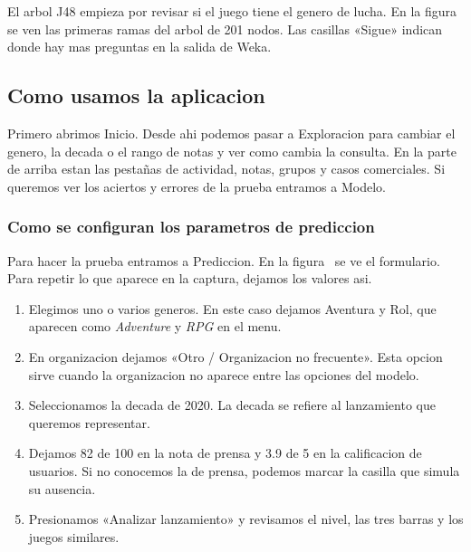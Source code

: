 
El arbol J48 empieza por revisar si el juego tiene el genero de lucha. En la figura~ se ven las primeras ramas del arbol de 201 nodos. Las casillas «Sigue» indican donde hay mas preguntas en la salida de Weka.


\subsection{Como usamos la aplicacion}
Primero abrimos Inicio. Desde ahi podemos pasar a Exploracion para cambiar el genero, la decada o el rango de notas y ver como cambia la consulta. En la parte de arriba estan las pestañas de actividad, notas, grupos y casos comerciales. Si queremos ver los aciertos y errores de la prueba entramos a Modelo.


\subsubsection{Como se configuran los parametros de prediccion}
Para hacer la prueba entramos a Prediccion. En la figura~ se ve el formulario. Para repetir lo que aparece en la captura, dejamos los valores asi.

\begin{enumerate}
\item Elegimos uno o varios generos. En este caso dejamos Aventura y Rol, que aparecen como \emph{Adventure} y \emph{RPG} en el menu.
\item En organizacion dejamos «Otro / Organizacion no frecuente». Esta opcion sirve cuando la organizacion no aparece entre las opciones del modelo.
\item Seleccionamos la decada de 2020. La decada se refiere al lanzamiento que queremos representar.
\item Dejamos 82 de 100 en la nota de prensa y 3.9 de 5 en la calificacion de usuarios. Si no conocemos la de prensa, podemos marcar la casilla que simula su ausencia.
\item Presionamos «Analizar lanzamiento» y revisamos el nivel, las tres barras y los juegos similares.
\end{enumerate}

